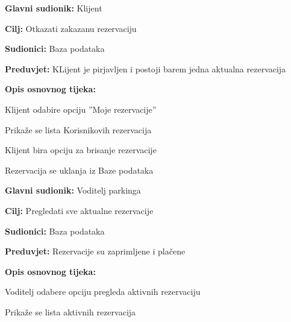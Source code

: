 \begin{packed_item}
\begin{packed_item}
\begin{packed_item}
\begin{packed_enum}
						\end{packed_enum}
					\end{packed_item}

                        \noindent {}
					\begin{packed_item}
	
						\item \textbf{Glavni sudionik: }Klijent
						\item  \textbf{Cilj:} Otkazati zakazanu rezervaciju
						\item  \textbf{Sudionici:} Baza podataka
						\item  \textbf{Preduvjet:} KLijent je pirjavljen i postoji barem jedna aktualna rezervacija
						\item  \textbf{Opis osnovnog tijeka:}
						
						\item[] \begin{packed_enum}
	
							\item Klijent odabire opciju ”Moje rezervacije”
							\item Prikaže se lista Korisnikovih rezervacija 
							\item Klijent bira opciju za brisanje rezervacije
                                \item Rezervacija se uklanja iz Baze podataka
							
						\end{packed_enum}
					\end{packed_item}

                        \noindent {}
					\begin{packed_item}
	
						\item \textbf{Glavni sudionik: }Voditelj parkinga
						\item  \textbf{Cilj:} Pregledati sve aktualne rezervacije
						\item  \textbf{Sudionici:} Baza podataka
						\item  \textbf{Preduvjet:} Rezervacije su zaprimljene i plačene
						\item  \textbf{Opis osnovnog tijeka:}
						
						\item[] \begin{packed_enum}
	
							\item Voditelj odabere opciju pregleda aktivnih rezervaciju
							\item Prikaže se lista aktivnih rezervacija
						

\end{packed_enum}
\end{packed_item}
\end{packed_item}
\end{packed_item}
